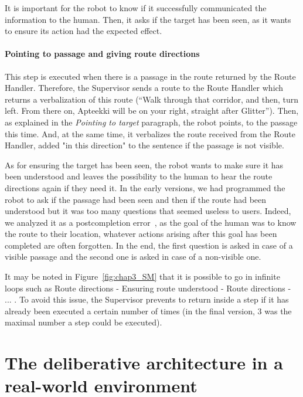 \documentclass[a4paper,11pt,twoside]{StyleThese}
\begin{document}
It is important for the robot to know if it successfully communicated the information to the human. Then, it asks if the target has been seen, as it wants to ensure its action had the expected effect.

\paragraph{Pointing to passage and giving route directions}\label{par:route_understood}
This step is executed when there is a passage in the route returned by the Route Handler. Therefore, the Supervisor sends a route to the Route Handler which returns a verbalization of this route (\eg ``Walk through that corridor, and then, turn left. From there on, Apteekki will be on your right, straight after Glitter''). Then, as explained in the \emph{Pointing to target} paragraph, the robot points, to the passage this time. And, at the same time, it verbalizes the route received from the Route Handler, added "in this direction" to the sentence if the passage is not visible.

As for ensuring the target has been seen, the robot wants to make sure it has been understood and leaves the possibility to the human to hear the route directions again if they need it. In the early versions, we had programmed the robot to ask if the passage had been seen and then if the route had been understood but it was too many questions that seemed useless to users. Indeed, we analyzed it as a postcompletion error~\cite{byrne_1997}, as the goal of the human was to know the route to their location, whatever actions arising after this goal has been completed are often forgotten. In the end, the first question is asked in case of a visible passage and the second one is asked in case of a non-visible one.

It may be noted in Figure~\ref{fig:chap3_SM} that it is possible to go in infinite loops such as Route directions - Ensuring route understood - Route directions - ... . To avoid this issue, the Supervisor prevents to return inside a step if it has already been executed a certain number of times (in the final version, 3 was the maximal number a step could be executed).

\section{The deliberative architecture in a real-world environment}\label{subsec:archi-integration}
\end{document}
